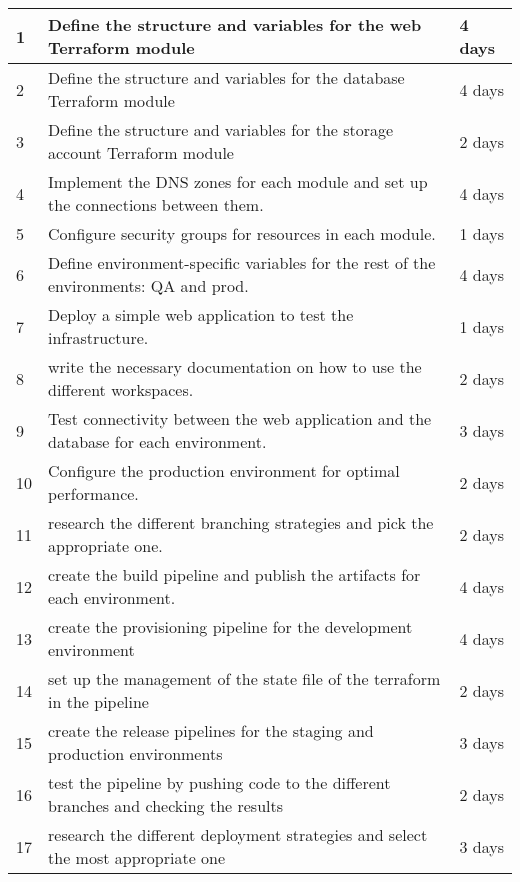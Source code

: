 \begin{longtable}[c]{
    |p{}
    |p{}|
    p{}|
    }
    1   & Define the structure and variables for the web Terraform module                      & 4 days \\ \hline
    2   & Define the structure and variables for the database Terraform module                 & 4 days \\ \hline
    3   & Define the structure and variables for the storage account Terraform module          & 2 days \\ \hline
    4   & Implement the DNS zones for each module and set up the connections between them.     & 4 days \\ \hline
    5   & Configure security groups for resources in each module.                              & 1 days \\ \hline
    6   & Define environment-specific variables for the rest of the environments: QA and prod. & 4 days \\ \hline
    7   & Deploy a simple web application to test the infrastructure.                          & 1 days \\ \hline
    8   & write the necessary documentation on how to use the different workspaces.            & 2 days \\ \hline
    9   & Test connectivity between the web application and the database for each environment. & 3 days \\ \hline
    10  & Configure the production environment for optimal performance.                        & 2 days \\ \hline
    11  & research the different branching strategies and pick the appropriate one.            & 2 days \\ \hline
    12  & create the build pipeline and publish the artifacts for each environment.            & 4 days \\ \hline
    13  & create the provisioning pipeline for the development environment                     & 4 days \\ \hline
    14  & set up the management of the state file of the terraform in the pipeline             & 2 days \\ \hline
    15  & create the release pipelines for the staging and production environments             & 3 days \\ \hline
    16  & test the pipeline by pushing code to the different branches and checking the results & 2 days \\ \hline
    17  & research the different deployment strategies and select the most appropriate one     & 3 days \\ \hline

\end{longtable}

